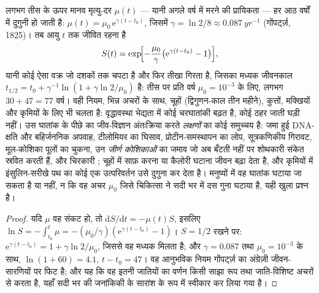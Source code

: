 \begin{proposition}[गोंपर्ट्ज़ का नियम]\label{prop:b3:stem-cells:gompertz}
लगभग तीस के ऊपर मानव मृत्यु-दर $\mu(t)$ --- यानी अगले वर्ष में मरने की
प्रायिकता --- हर आठ वर्षों में दुगुनी हो जाती है: $\mu(t) =
\mu_{0}\,\mathrm{e}^{\gamma(t - t_{0})}$, जिसमें $\gamma = \ln 2/8 \approx
\qty{0.087}{yr^{-1}}$ (गोंपर्ट्ज़, 1825)। तब आयु $t$ तक जीवित रहना है
\[
S(t) = \exp\!\Bigl[-\frac{\mu_{0}}{\gamma}\bigl(\mathrm{e}^{\gamma(t - t_{0})} - 1\bigr)\Bigr],
\]
यानी कोई ऐसा वक्र जो दशकों तक चपटा है और फिर तीखा गिरता है, जिसका
मध्यक जीवनकाल $t_{1/2} = t_{0} + \gamma^{-1}\ln(1 + \gamma\ln 2/\mu_{0})$
है: तीस पर प्रति वर्ष $\mu_{0} = 10^{-3}$ के लिए, लगभग $30 + 47 = 77$
वर्ष। वही नियम, भिन्न अचरों के साथ, चूहों (द्विगुणन-काल तीन महीने),
कुत्तों, मक्खियों और कृमियों के लिए भी चलता है: वृद्धावस्था भेद्यता में
कोई चरघातांकी बढ़त है, कोई ठहर जाती घड़ी नहीं। उस घातांक के पीछे का
जीव-विज्ञान अंतःक्रिया करते \emph{लक्षणों} का कोई समुच्चय है: जमा हुई
DNA-क्षति और बहिर्जननिक अपवाह, टीलोमियर का घिसाव, प्रोटीन-समस्थापन का
लोप, सूत्रकणिकीय गिरावट, मूल-कोशिका पूलों का चुकना, उन \emph{जीर्ण
कोशिकाओं} का जमाव जो अब बँटती नहीं पर शोथकारी संकेत स्रवित करती हैं, और
चिरकारी ; चूहों में  साफ़ करना या कैलोरी घटाना जीवन
बढ़ा देता है, और कृमियों में इंसुलिन-सरीखे पथ का कोई एक उत्परिवर्तन उसे
दुगुना कर देता है। मनुष्यों में वह घातांक घटाया जा सकता है या नहीं, न कि
वह अचर $\mu_{0}$ जिसे चिकित्सा ने सदी भर में दस गुना घटाया है, यही खुला
प्रश्न है।
\end{proposition}
\begin{proof}
यदि $\mu$ वह संकट हो, तो $\mathrm{d}S/\mathrm{d}t = -\mu(t)S$, इसलिए
$\ln S =
-\int_{t_{0}}^{t}\mu = -(\mu_{0}/\gamma)(\mathrm{e}^{\gamma(t-t_{0})} -
1)$। $S = 1/2$ रखने पर: $\mathrm{e}^{\gamma(t-t_{0})} = 1 + \gamma\ln 2/
\mu_{0}$, जिससे वह मध्यक मिलता है; और $\gamma = 0.087$ तथा $\mu_{0} =
10^{-3}$ के साथ, $\ln(1 + 60) = 4.1$, $t - t_{0} = 47$। वह आनुभविक नियम
गोंपर्ट्ज़ का अंग्रेज़ी जीवन-सारणियों पर फिट है; और यह कि वह इतनी
जातियों का वर्णन किसी साझा रूप तथा जाति-विशिष्ट अचरों से करता है, यहाँ
सदी भर की जनांकिकी के सारांश के रूप में स्वीकार कर लिया गया है।
\end{proof}

